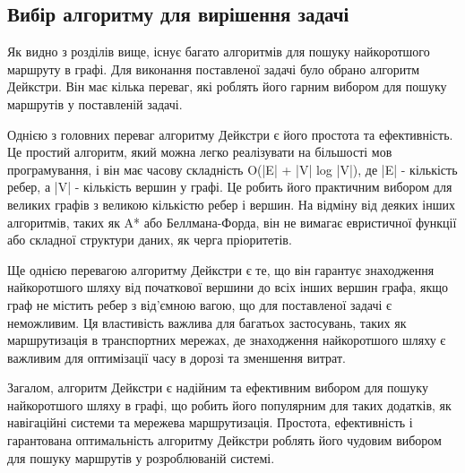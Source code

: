 \subsection{Вибір алгоритму для вирішення задачі}
\label{subsec:bfs-subsection}


Як видно з розділів вище, існує багато алгоритмів для пошуку найкоротшого маршруту в графі. Для виконання поставленої задачі було обрано алгоритм Дейкстри. Він має кілька переваг, які роблять його гарним вибором для пошуку маршрутів у поставленій задачі.

Однією з головних переваг алгоритму Дейкстри є його простота та ефективність. Це простий алгоритм, який можна легко реалізувати на більшості мов програмування, і він має часову складність O(|E| + |V| log |V|), де |E| - кількість ребер, а |V| - кількість вершин у графі. Це робить його практичним вибором для великих графів з великою кількістю ребер і вершин. На відміну від деяких інших алгоритмів, таких як A* або Беллмана-Форда, він не вимагає евристичної функції або складної структури даних, як черга пріоритетів.

Ще однією перевагою алгоритму Дейкстри є те, що він гарантує знаходження найкоротшого шляху від початкової вершини до всіх інших вершин графа, якщо граф не містить ребер з від'ємною вагою, що для поставленої задачі є неможливим. Ця властивість важлива для багатьох застосувань, таких як маршрутизація в транспортних мережах, де знаходження найкоротшого шляху є важливим для оптимізації часу в дорозі та зменшення витрат.
 
Загалом, алгоритм Дейкстри є надійним та ефективним вибором для пошуку найкоротшого шляху в графі, що робить його популярним для таких додатків, як навігаційні системи та мережева маршрутизація. Простота, ефективність і гарантована оптимальність алгоритму Дейкстри роблять його чудовим вибором для пошуку маршрутів у розроблюваній системі.